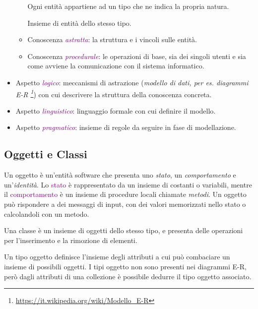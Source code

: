 \begin{itemize}
\begin{itemize}
\begin{definition}
                    Ogni entità appartiene ad un tipo che ne indica la propria natura.
                \end{definition}
                \begin{definition}[Collezione]
                    Insieme di entità dello stesso tipo.
                \end{definition}
            \item Conoscenza \emph{\textcolor{purple}{astratta}}: la struttura e i vincoli sulle entità.
            \item Conoscenza \emph{\textcolor{purple}{procedurale}}: le operazioni di base, sia dei singoli utenti e sia come avviene la comunicazione con il sistema informatico.
        \end{itemize}
    \item Aspetto \emph{\textcolor{purple}{logico}}: meccanismi di astrazione (\emph{modello di dati, per es. diagrammi E-R \footnote{\url{https://it.wikipedia.org/wiki/Modello_E-R}}}) con cui descrivere la struttura della conoscenza concreta.
    \item Aspetto \emph{\textcolor{purple}{linguistico}}: linguaggio formale con cui definire il modello.
    \item Aspetto \emph{\textcolor{purple}{pragmatico}}: insieme di regole da seguire in fase di modellazione.
\end{itemize}

\subsection{Oggetti e Classi}

\begin{definition}[Oggetto]
    Un oggetto è un'entità software che presenta uno \emph{stato}, un \emph{comportamento} e un'\emph{identità}.
    Lo \textcolor{purple}{stato} è rappresentato da un insieme di costanti o variabili, mentre il \textcolor{purple}{comportamento} è un
    insieme di procedure locali chiamate \emph{metodi}.
    Un oggetto può rispondere a dei messaggi di input, con dei valori memorizzati nello stato o
    calcolandoli con un metodo.
\end{definition}

\begin{definition}[Classe]
    Una classe è un insieme di oggetti dello stesso tipo, e presenta delle operazioni per l'inserimento
    e la rimozione di elementi.
\end{definition}

\begin{definition}
    Un tipo oggetto definisce l'insieme degli attributi a cui può combaciare
    un insieme di possibili oggetti. I tipi oggetto non sono presenti nei diagrammi E-R,
    però dagli attributi di una collezione è possibile dedurre il tipo oggetto associato.
\end{definition}